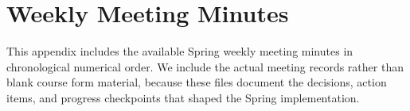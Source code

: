 \chapter{Weekly Meeting Minutes}
\label{appendix:minutes}

This appendix includes the available Spring weekly meeting minutes in chronological numerical order. We include the actual meeting records rather than blank course form material, because these files document the decisions, action items, and progress checkpoints that shaped the Spring implementation.










